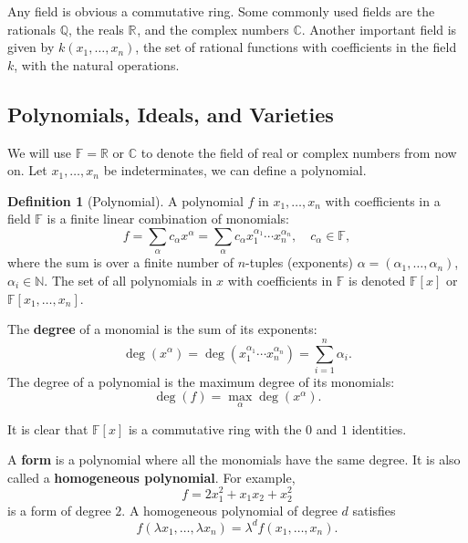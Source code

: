 \documentclass[
]{book}
\theoremstyle{definition}
\newtheorem{definition}{Definition}[chapter]
\theoremstyle{definition}
\theoremstyle{definition}
\theoremstyle{definition}
\theoremstyle{remark}
\begin{document}
Any field is obvious a commutative ring. Some commonly used fields are the rationals \(\mathbb{Q}\), the reals \(\mathbb{R}^{}\), and the complex numbers \(\mathbb{C}\). Another important field is given by \(k(x_1,\dots,x_n)\), the set of rational functions with coefficients in the field \(k\), with the natural operations.

\subsection{Polynomials, Ideals, and Varieties}\label{polynomials-ideals-and-varieties}

We will use \(\mathbb{F}= \mathbb{R}\) or \(\mathbb{C}\) to denote the field of real or complex numbers from now on. Let \(x_1,\dots,x_n\) be indeterminates, we can define a polynomial.

\begin{definition}[Polynomial]
\protect\hypertarget{def:Polynomial}{}\label{def:Polynomial}A polynomial \(f\) in \(x_1,\dots,x_n\) with coefficients in a field \(\mathbb{F}\) is a finite linear combination of monomials:
\[
f = \sum_{\alpha} c_\alpha x^\alpha = \sum_{\alpha} c_\alpha x_1^{\alpha_1}\cdots x_n^{\alpha_n}, \quad c_\alpha \in \mathbb{F},
\]
where the sum is over a finite number of \(n\)-tuples (exponents) \(\alpha = (\alpha_1,\dots,\alpha_n)\), \(\alpha_i \in \mathbb{N}\). The set of all polynomials in \(x\) with coefficients in \(\mathbb{F}\) is denoted \(\mathbb{F}[x]\) or \(\mathbb{F}[x_1,\dots,x_n]\).
\end{definition}

The \textbf{degree} of a monomial is the sum of its exponents:
\[
\deg(x^\alpha) = \deg(x_1^{\alpha_1}\cdots x_n^{\alpha_n}) = \sum_{i=1}^n \alpha_i.
\]
The degree of a polynomial is the maximum degree of its monomials:
\[
\deg(f) = \max_{\alpha} \deg(x^\alpha).
\]

It is clear that \(\mathbb{F}[x]\) is a commutative ring with the \(0\) and \(1\) identities.

A \textbf{form} is a polynomial where all the monomials have the same degree. It is also called a \textbf{homogeneous polynomial}. For example,
\[
f = 2 x_1^2 + x_1 x_2 + x_2^2
\]
is a form of degree \(2\). A homogeneous polynomial of degree \(d\) satisfies
\[
f(\lambda x_1,\dots,\lambda x_n) = \lambda^d f(x_1,\dots,x_n).
\]
\end{document}
